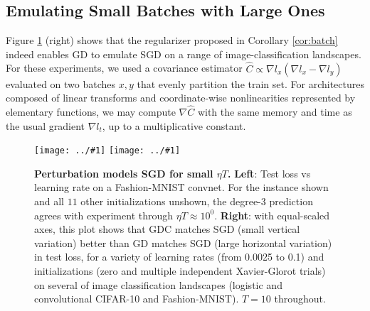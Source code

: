 \documentclass{article}
\theoremstyle{plain}
\theoremstyle{definition}
\newcommand{\plotmoow}[3]{\texttt{[image: ../\#1]}}
\begin{document}
    \subsection{Emulating Small Batches with Large Ones}
        Figure \ref{fig:vanillaandbatch} (right) shows that the regularizer
        proposed in Corollary \ref{cor:batch} indeed enables GD to emulate SGD
        on a range of image-classification landscapes.  For these experiments,
        we used a covariance estimator $\hat C \propto \nabla l_x (\nabla l_x -
        \nabla l_y)$ evaluated on two batches $x, y$ that evenly partition the
        train set.  For architectures composed of linear transforms and
        coordinate-wise nonlinearities represented by elementary functions, we
        may compute $\nabla \hat C$ with the same memory and time as the usual
        gradient $\nabla l_t$, up to a multiplicative constant. 
        \begin{figure}[h!] 
            \centering
            \plotmoow{plots/new-test-0}{0.48\columnwidth}{3.0cm} 
            \plotmoow{plots/new-big-bm-new}{0.48\columnwidth}{4.0cm}
            \caption{
                {\bf Perturbation models SGD for small $\eta T$.}
                {\bf Left}: Test loss vs learning rate on a Fashion-MNIST
                convnet.  For the instance shown and all $11$ other
                initializations unshown, the degree-$3$ prediction agrees with
                experiment through $\eta T \approx 10^0$.
                {\bf Right}: with equal-scaled axes, this plot shows that GDC
                matches SGD (small vertical variation) better than GD matches
                SGD (large horizontal variation) in test loss, for a variety of
                learning rates (from 0.0025 to 0.1) and initializations (zero
                and multiple independent Xavier-Glorot trials) on several of
                image classification landscapes (logistic and convolutional
                CIFAR-10 and Fashion-MNIST).  $T=10$ throughout.
            }
            \label{fig:vanillaandbatch}
        \end{figure}
  
\end{document}

